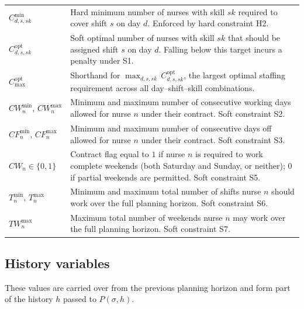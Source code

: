 \documentclass[11pt]{article}
\begin{document}
\begin{tabular}{@{}lp{10cm}@{}}
  $C^{\min}_{d,s,sk}$ &
    Hard minimum number of nurses with skill $sk$ required to cover
    shift $s$ on day $d$. Enforced by hard constraint H2. \\[6pt]

  $C^{\text{opt}}_{d,s,sk}$ &
    Soft optimal number of nurses with skill $sk$ that should be
    assigned shift $s$ on day $d$. Falling below this target
    incurs a penalty under S1. \\[6pt]

  $C^{\text{opt}}_{\max}$ &
    Shorthand for $\max_{d,s,sk}\, C^{\text{opt}}_{d,s,sk}$, the
    largest optimal staffing requirement across all
    day--shift--skill combinations. \\[6pt]

  $CW^{\min}_n,\, CW^{\max}_n$ &
    Minimum and maximum number of consecutive working days allowed
    for nurse $n$ under their contract. Soft constraint S2. \\[6pt]

  $CF^{\min}_n,\, CF^{\max}_n$ &
    Minimum and maximum number of consecutive days off allowed for
    nurse $n$ under their contract. Soft constraint S3. \\[6pt]

  $CW_n \in \{0,1\}$ &
    Contract flag equal to $1$ if nurse $n$ is required to work
    complete weekends (both Saturday and Sunday, or neither); $0$
    if partial weekends are permitted. Soft constraint S5. \\[6pt]

  $T^{\min}_n,\, T^{\max}_n$ &
    Minimum and maximum total number of shifts nurse $n$ should work
    over the full planning horizon. Soft constraint S6. \\[6pt]

  $TW^{\max}_n$ &
    Maximum total number of weekends nurse $n$ may work over the
    full planning horizon. Soft constraint S7. \\
\end{tabular}

\subsection*{History variables}

These values are carried over from the previous planning horizon and
form part of the history $h$ passed to $P(\sigma, h)$.
\end{document}
